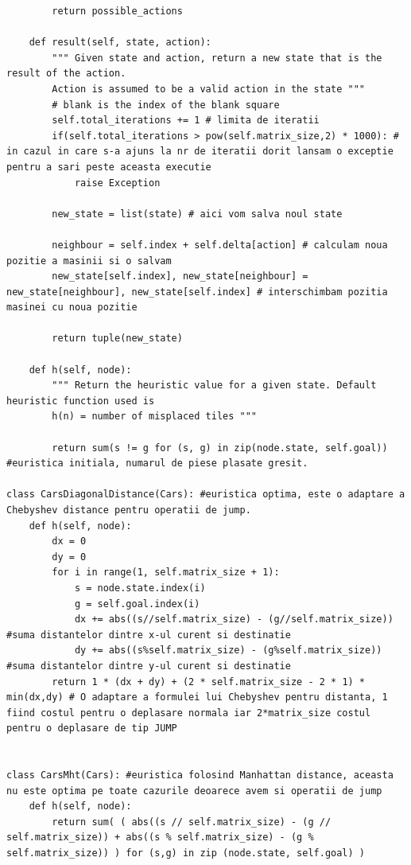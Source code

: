 \documentclass[14pt]{article}
\begin{document}
\begin{lstlisting}
        return possible_actions

    def result(self, state, action):
        """ Given state and action, return a new state that is the result of the action.
        Action is assumed to be a valid action in the state """
        # blank is the index of the blank square
        self.total_iterations += 1 # limita de iteratii
        if(self.total_iterations > pow(self.matrix_size,2) * 1000): # in cazul in care s-a ajuns la nr de iteratii dorit lansam o exceptie pentru a sari peste aceasta executie
            raise Exception

        new_state = list(state) # aici vom salva noul state
       
        neighbour = self.index + self.delta[action] # calculam noua pozitie a masinii si o salvam
        new_state[self.index], new_state[neighbour] = new_state[neighbour], new_state[self.index] # interschimbam pozitia masinei cu noua pozitie

        return tuple(new_state)

    def h(self, node):
        """ Return the heuristic value for a given state. Default heuristic function used is
        h(n) = number of misplaced tiles """

        return sum(s != g for (s, g) in zip(node.state, self.goal)) #euristica initiala, numarul de piese plasate gresit.

class CarsDiagonalDistance(Cars): #euristica optima, este o adaptare a Chebyshev distance pentru operatii de jump.
    def h(self, node):
        dx = 0
        dy = 0
        for i in range(1, self.matrix_size + 1):
            s = node.state.index(i)
            g = self.goal.index(i)
            dx += abs((s//self.matrix_size) - (g//self.matrix_size)) #suma distantelor dintre x-ul curent si destinatie
            dy += abs((s%self.matrix_size) - (g%self.matrix_size)) #suma distantelor dintre y-ul curent si destinatie
        return 1 * (dx + dy) + (2 * self.matrix_size - 2 * 1) * min(dx,dy) # O adaptare a formulei lui Chebyshev pentru distanta, 1 fiind costul pentru o deplasare normala iar 2*matrix_size costul pentru o deplasare de tip JUMP


class CarsMht(Cars): #euristica folosind Manhattan distance, aceasta nu este optima pe toate cazurile deoarece avem si operatii de jump
    def h(self, node):
        return sum( ( abs((s // self.matrix_size) - (g // self.matrix_size)) + abs((s % self.matrix_size) - (g % self.matrix_size)) ) for (s,g) in zip (node.state, self.goal) )




\end{lstlisting}
\end{document}
